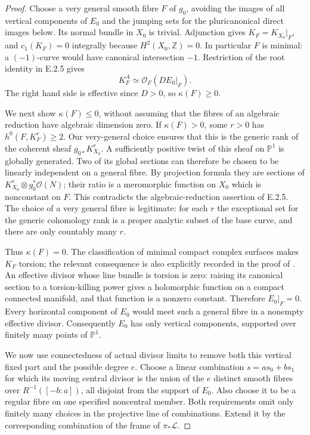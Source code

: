 \begin{proof}
Choose a very general smooth fibre $F$ of $g_0$, avoiding the
images of all vertical components of $E_0$ and the jumping
sets for the pluricanonical direct images below.  Its normal
bundle in $X_0$ is trivial.  Adjunction gives
$K_F=K_{X_0}|_F$, and $c_1(K_F)=0$ integrally because
$H^2(X_0,\mathbb Z)=0$.  In particular $F$ is minimal: a
$(-1)$-curve would have canonical intersection $-1$.
Restriction of the root identity in E.2.5 gives
\[
 K_F^{A}\simeq\mathcal O_F(D E_0|_F).
\]
The right hand side is effective since $D>0$, so
$\kappa(F)\ge0$.

We next show $\kappa(F)\le0$, without assuming that the fibres
of an algebraic reduction have algebraic dimension zero.
If $\kappa(F)>0$, some $r>0$ has $h^0(F,K_F^r)\ge2$.
Our very-general choice ensures that this is the generic rank
of the coherent sheaf $g_{0*}K_{X_0}^r$.  A sufficiently
positive twist of this sheaf on $\mathbb P^1$ is globally
generated.  Two of its global sections can therefore be
chosen to be linearly independent on a general fibre.  By
projection formula they are sections of
$K_{X_0}^r\otimes g_0^*\mathcal O(N)$; their ratio is a
meromorphic function on $X_0$ which is nonconstant on $F$.
This contradicts the algebraic-reduction assertion of E.2.5.
The choice of a very general fibre is legitimate: for each
$r$ the exceptional set for the generic cohomology rank is
a proper analytic subset of the base curve, and there are
only countably many $r$.

Thus $\kappa(F)=0$.  The classification of minimal compact
complex surfaces makes $K_F$ torsion; the relevant consequence
is also explicitly recorded in the proof of
\citet[Proposition~3.1.2]{AbashevaDeev2024AB}.
An effective divisor whose line bundle is torsion is zero:
raising its canonical section to a torsion-killing power
gives a holomorphic function on a compact connected manifold,
and that function is a nonzero constant.  Therefore
$E_0|_F=0$.  Every horizontal component of $E_0$ would meet
such a general fibre in a nonempty effective divisor.
Consequently $E_0$ has only vertical components, supported
over finitely many points of $\mathbb P^1$.

We now use connectedness of actual divisor limits to remove
both this vertical fixed part and the possible degree $e$.
Choose a linear combination $s=as_0+bs_1$ for which its
moving central divisor is the union of the $e$ distinct
smooth fibres over $R^{-1}([-b:a])$, all disjoint from the
support of $E_0$.  Also choose it to be a regular fibre on
one specified noncentral member.  Both requirements omit
only finitely many choices in the projective line of
combinations.  Extend it by the corresponding combination
of the frame of $\pi_*\mathcal L$.


\end{proof}
